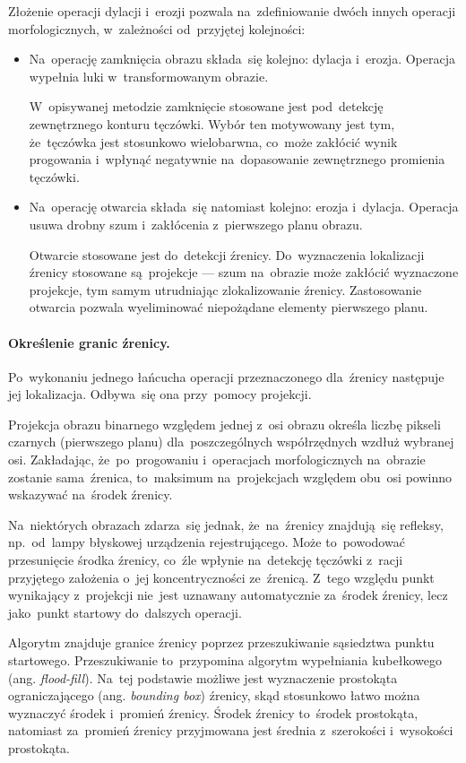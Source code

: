 \documentclass[11pt,a4paper]{article}
\begin{document}
Złożenie operacji dylacji i~erozji pozwala na~zdefiniowanie dwóch innych operacji morfologicznych, w~zależności od~przyjętej kolejności:
\begin{itemize}
    \item Na~operację zamknięcia obrazu składa~się kolejno: dylacja i~erozja.
    Operacja wypełnia luki w~transformowanym obrazie.

    W~opisywanej metodzie zamknięcie stosowane jest pod~detekcję zewnętrznego konturu tęczówki.
    Wybór ten motywowany jest tym, że~tęczówka jest stosunkowo wielobarwna, co~może zakłócić wynik progowania i~wpłynąć negatywnie na~dopasowanie zewnętrznego promienia tęczówki.
    \item Na~operację otwarcia składa~się natomiast kolejno: erozja i~dylacja.
    Operacja usuwa drobny szum i~zakłócenia z~pierwszego planu obrazu.

    Otwarcie stosowane jest do~detekcji źrenicy.
    Do~wyznaczenia lokalizacji źrenicy stosowane są~projekcje --- szum na~obrazie może zakłócić wyznaczone projekcje, tym samym utrudniając zlokalizowanie źrenicy.
    Zastosowanie otwarcia pozwala wyeliminować niepożądane elementy pierwszego planu.
\end{itemize}

\paragraph{Określenie granic źrenicy.}

Po~wykonaniu jednego łańcucha operacji przeznaczonego dla~źrenicy następuje jej lokalizacja.
Odbywa~się ona przy~pomocy projekcji.

Projekcja obrazu binarnego względem jednej z~osi obrazu określa liczbę pikseli czarnych (pierwszego planu) dla~poszczególnych współrzędnych wzdłuż wybranej osi.
Zakładając, że~po~progowaniu i~operacjach morfologicznych na~obrazie zostanie sama~źrenica, to~maksimum na~projekcjach względem obu~osi powinno wskazywać na~środek źrenicy.

Na~niektórych obrazach zdarza~się jednak, że~na~źrenicy znajdują~się refleksy, np.~od~lampy błyskowej urządzenia rejestrującego.
Może to~powodować przesunięcie środka źrenicy, co~źle wpłynie na~detekcję tęczówki z~racji przyjętego założenia o~jej koncentryczności ze~źrenicą.
Z~tego względu punkt wynikający z~projekcji nie~jest uznawany automatycznie za~środek źrenicy, lecz jako~punkt startowy do~dalszych operacji.

Algorytm znajduje granice źrenicy poprzez przeszukiwanie sąsiedztwa punktu startowego.
Przeszukiwanie to~przypomina algorytm wypełniania kubełkowego (ang. \emph{flood-fill}).
Na~tej podstawie możliwe jest wyznaczenie prostokąta ograniczającego (ang. \emph{bounding box}) źrenicy, skąd stosunkowo łatwo można wyznaczyć środek i~promień źrenicy.
Środek źrenicy to~środek prostokąta, natomiast za~promień źrenicy przyjmowana jest średnia z~szerokości i~wysokości prostokąta.
\end{document}
